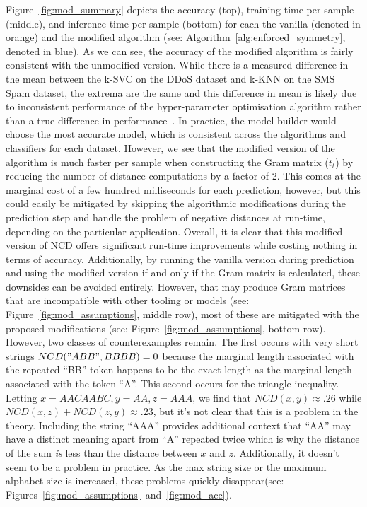 \documentclass[conference]{IEEEtran}
\begin{document}
Figure~\ref{fig:mod_summary} depicts the accuracy (top), training time per sample (middle), and inference time per sample (bottom) for each the vanilla (denoted in orange) and the modified algorithm (see: Algorithm~\ref{alg:enforced_symmetry}, denoted in blue). As we can see, the accuracy of the modified algorithm is fairly consistent with the unmodified version. While there is a measured difference in the mean between the k-SVC on the DDoS dataset and k-KNN on the SMS Spam dataset, the extrema are the same and this difference in mean is likely due to inconsistent performance of the hyper-parameter optimisation algorithm rather than a true difference in performance~\cite{tpe}. In practice, the model builder would choose the most accurate model, which is consistent across the algorithms and classifiers for each dataset. However, we see that the modified version of the algorithm is much faster per sample when constructing the Gram matrix ($t_t$) by reducing the number of distance computations by a factor of 2. This comes at the marginal cost of a few hundred milliseconds for each prediction, however, but this could easily be mitigated by skipping the algorithmic modifications during the prediction step and handle the problem of negative distances at run-time, depending on the particular application. Overall, it is clear that this modified version of NCD offers significant run-time improvements while costing nothing in terms of accuracy. 
Additionally, by running the vanilla version during prediction and using the modified version if and only if the Gram matrix is calculated, these downsides can be avoided entirely. 
However, that may produce Gram matrices that are incompatible with other tooling or models (see: Figure~\ref{fig:mod_assumptions}, middle row), most of these are mitigated with the proposed modifications (see: Figure~\ref{fig:mod_assumptions}, bottom row). 
However, two classes of counterexamples remain. 
The first occurs with very short strings
$NCD("ABB", BBBB) =0$ because the marginal length associated with the repeated ``BB'' token happens to be the exact length as the marginal length associated with the token ``A''. 
This second occurs for the triangle inequality. 
Letting $x =AACAABC, y = AA,
z=AAA$, we find that $NCD(x,y) \approx .26$ while $NCD(x,z) + NCD(z,y) \approx .23$, but it's not clear that this is a problem in the theory. Including the string ``AAA'' provides additional context that ``AA'' may have a distinct meaning apart from ``A'' repeated twice which is why the distance of the sum \textit{is} less than the distance between $x$ and $z$. Additionally, it doesn't seem to be a problem in practice. As the max string size or the maximum alphabet size is increased, these problems quickly disappear(see: Figures~\ref{fig:mod_assumptions}~and~\ref{fig:mod_acc}).
\end{document}
